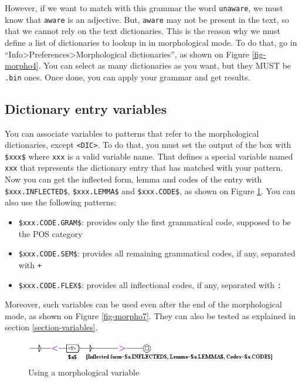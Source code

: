 \bigskip
\noindent However, if we want to match with this grammar the word 
\verb+unaware+, we must know that \verb+aware+ is an adjective. But,
\verb+aware+ may not be present in the text, so that we cannot rely on the text
dictionaries. This is the reason why we must define a list of dictionaries
to lookup in in morphological mode. To do that, go in
``Info>Preferences>Morphological dictionaries'', as shown on Figure
\ref{fig-morpho4}. You can select as many dictionaries as you want, but they
MUST be \verb+.bin+ ones. Once done, you can apply your grammar and get results.

\subsection{Dictionary entry variables}
You can associate variables to patterns that refer to the morphological dictionaries,
except \verb+<DIC>+. To do that, you must set the output of the box with
\verb+$xxx$+ where \verb+xxx+ is a valid variable name. That defines a
special variable named \verb+xxx+ that represents the dictionary entry that has
matched with your pattern. Now you can get the inflected form, lemma and codes
of the entry with \verb+$xxx.INFLECTED$+, \verb+$xxx.LEMMA$+ and
\verb+$xxx.CODE$+, as shown on Figure \ref{fig-morpho5}. You can also use the
following patterns:
\begin{itemize}
  \item \verb+$xxx.CODE.GRAM$+: provides only the first grammatical code,
  supposed to be the POS category
  
  \item \verb+$xxx.CODE.SEM$+: provides all remaining grammatical codes, if any,
  separated with \verb$+$
  
  \item \verb+$xxx.CODE.FLEX$+: provides all inflectional codes, if
  any, separated with \verb$:$
\end{itemize}

\noindent Moreover, such variables can be used even after the end of the
morphological mode, as shown on Figure \ref{fig-morpho7}. They can also be
tested as explained in section \ref{section-variables}.
 
\begin{figure}[!ht]
\begin{center}
\includegraphics[width=16cm]{resources/img/fig6-17o.png}
\caption{Using a morphological variable\label{fig-morpho5}}
\end{center}
\end{figure}

